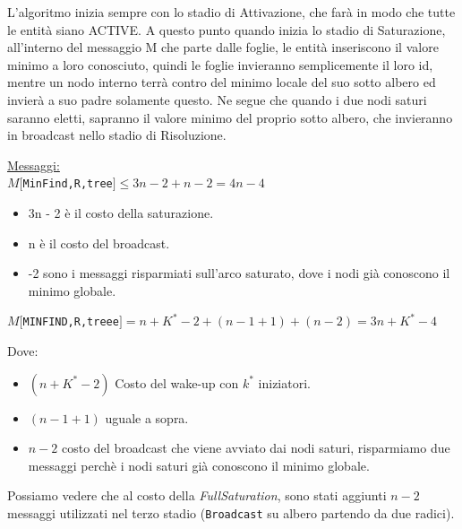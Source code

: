 L'algoritmo inizia sempre con lo stadio di Attivazione, che farà in modo che tutte le entità siano ACTIVE. A questo punto quando inizia lo stadio di Saturazione, all'interno del messaggio M che parte dalle foglie, le entità inseriscono il valore minimo a loro conosciuto, quindi le foglie invieranno semplicemente il loro id, mentre un nodo interno terrà contro del minimo locale del suo sotto albero ed invierà a suo padre solamente questo. Ne segue che quando i due nodi saturi saranno eletti, sapranno il valore minimo del proprio sotto albero, che invieranno in broadcast nello stadio di Risoluzione.


\underline{Messaggi:}\\
$M[$\texttt{MinFind,R,tree}$] \leq 3n - 2 + n - 2 = 4n - 4$
\begin{itemize}
    \item 3n - 2 è il costo della saturazione.
    \item n è il costo del broadcast.
    \item -2 sono i messaggi risparmiati sull'arco saturato, dove i nodi già conoscono il minimo globale.
\end{itemize}

\begin{center}
  $M[$\texttt{MINFIND,R,treee}$] = n + K^* - 2 + (n-1+1) + (n-2) = 3n + K^* - 4$\\
\end{center}
Dove:
\begin{itemize}
    \item $(n + K^* - 2)$ Costo del wake-up con $k^*$ iniziatori.
    \item $(n-1+1)$ uguale a sopra.
    \item $n-2$ costo del broadcast che viene avviato dai nodi saturi, risparmiamo due messaggi perchè i nodi saturi già conoscono il minimo globale.
\end{itemize}
Possiamo vedere che al costo della \textit{FullSaturation}, sono stati aggiunti $n-2$ messaggi utilizzati nel terzo stadio (\texttt{Broadcast} su albero partendo da due radici).



